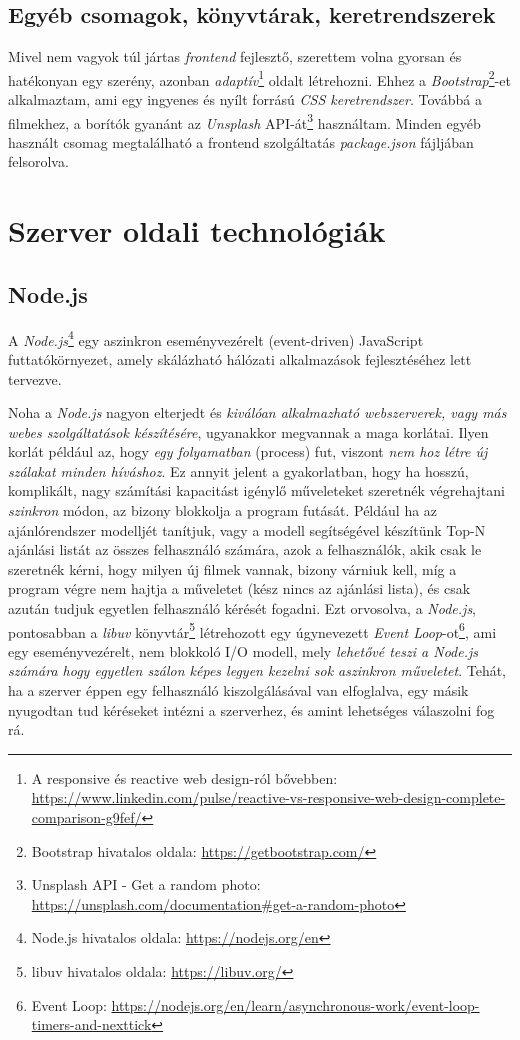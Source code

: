 \documentclass[
]{thesis-ekf}
\theoremstyle{definition}
\theoremstyle{remark}
\begin{document}
\subsection{Egyéb csomagok, könyvtárak, keretrendszerek}
Mivel nem vagyok túl jártas \emph{frontend} fejlesztő, szerettem volna gyorsan és hatékonyan egy szerény, azonban \emph{adaptív}\footnote{A responsive és reactive web design-ról bővebben: \url{https://www.linkedin.com/pulse/reactive-vs-responsive-web-design-complete-comparison-g9fef/}} oldalt létrehozni. Ehhez a \emph{Bootstrap}\footnote{Bootstrap hivatalos oldala: \url{https://getbootstrap.com/}}-et alkalmaztam, ami egy ingyenes és nyílt forrású \emph{CSS keretrendszer}. Továbbá a filmekhez, a borítók gyanánt az \emph{Unsplash} API-át\footnote{Unsplash API - Get a random photo:  \url{https://unsplash.com/documentation\#get-a-random-photo}} használtam. Minden egyéb használt csomag megtalálható a frontend szolgáltatás \emph{package.json} fájljában felsorolva.

\section{Szerver oldali technológiák}
\subsection{Node.js}
A \emph{Node.js}\footnote{Node.js hivatalos oldala: \url{https://nodejs.org/en}} egy aszinkron eseményvezérelt (event-driven) JavaScript futtatókörnyezet, amely skálázható hálózati alkalmazások fejlesztéséhez lett tervezve.\cite{nodejs-homepage}

Noha a \emph{Node.js} nagyon elterjedt és \emph{kiválóan alkalmazható webszerverek, vagy más webes szolgáltatások készítésére}, ugyanakkor megvannak a maga korlátai. Ilyen korlát például az, hogy \emph{egy folyamatban} (process) fut, viszont \emph{nem hoz létre új szálakat minden híváshoz}.\cite{node-docs} Ez annyit jelent a gyakorlatban, hogy ha hosszú, komplikált, nagy számítási kapacitást igénylő műveleteket szeretnék végrehajtani \emph{szinkron} módon, az bizony blokkolja a program futását. Például ha az ajánlórendszer modelljét tanítjuk, vagy a modell segítségével készítünk Top-N ajánlási listát az összes felhasználó számára, azok a felhasználók, akik csak le szeretnék kérni, hogy milyen új filmek vannak, bizony várniuk kell, míg a program végre nem hajtja a műveletet (kész nincs az ajánlási lista), és csak azután tudjuk egyetlen felhasználó kérését fogadni. Ezt orvosolva, a \emph{Node.js}, pontosabban a \emph{libuv} könyvtár\footnote{libuv hivatalos oldala: \url{https://libuv.org/}} létrehozott egy úgynevezett \emph{Event Loop}-ot\footnote{Event Loop: \url{https://nodejs.org/en/learn/asynchronous-work/event-loop-timers-and-nexttick}}, ami egy eseményvezérelt, nem blokkoló I/O modell, mely \emph{lehetővé teszi a Node.js számára hogy egyetlen szálon képes legyen kezelni sok aszinkron műveletet}. Tehát, ha a szerver éppen egy felhasználó kiszolgálásával van elfoglalva, egy másik nyugodtan tud kéréseket intézni a szerverhez, és amint lehetséges válaszolni fog rá.
\end{document}
